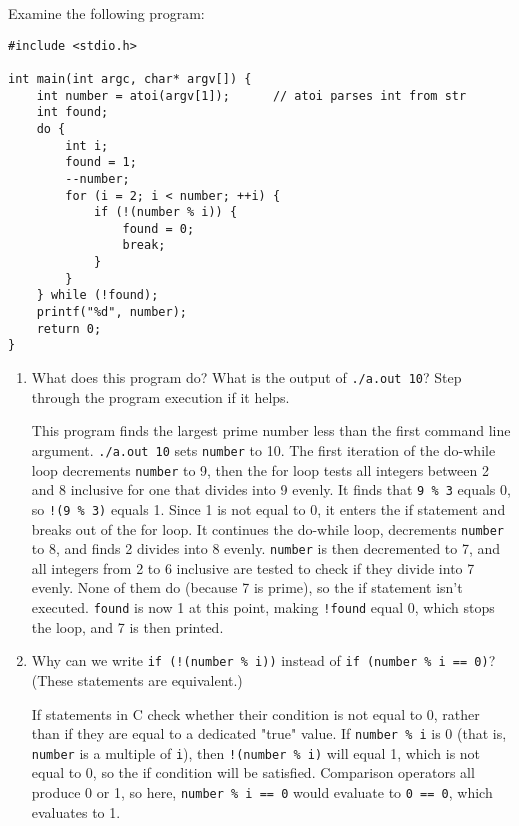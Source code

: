 Examine the following program:

\begin{verbatim}
#include <stdio.h>

int main(int argc, char* argv[]) {
    int number = atoi(argv[1]);      // atoi parses int from str
    int found;
    do {
        int i;
        found = 1;
        --number;
        for (i = 2; i < number; ++i) {
            if (!(number % i)) {
                found = 0;
                break;
            }
        }
    } while (!found);
    printf("%d", number);
    return 0;
}
\end{verbatim}

\begin{enumerate}

\item What does this program do? What is the output of \texttt{./a.out 10}? Step through the program execution if it helps.

\begin{answer}
This program finds the largest prime number less than the first command line argument. \texttt{./a.out 10} sets \texttt{number} to 10. The first iteration of the do-while loop decrements \texttt{number} to 9, then the for loop tests all integers between 2 and 8 inclusive for one that divides into 9 evenly. It finds that \texttt{9 \% 3} equals 0, so \texttt{!(9 \% 3)} equals 1. Since 1 is not equal to 0, it enters the if statement and breaks out of the for loop. It continues the do-while loop, decrements \texttt{number} to 8, and finds 2 divides into 8 evenly. \texttt{number} is then decremented to 7, and all integers from 2 to 6 inclusive are tested to check if they divide into 7 evenly. None of them do (because 7 is prime), so the if statement isn't executed. \texttt{found} is now 1 at this point, making \texttt{!found} equal 0, which stops the loop, and 7 is then printed.
\end{answer}



\item Why can we write \texttt{if (!(number \% i))} instead of \texttt{if (number \% i == 0)}? (These statements are equivalent.)

\begin{answer}
If statements in C check whether their condition is not equal to 0, rather than if they are equal to a dedicated "true" value. If \texttt{number \% i} is 0 (that is, \texttt{number} is a multiple of \texttt{i}), then \texttt{!(number \% i)} will equal 1, which is not equal to 0, so the if condition will be satisfied. Comparison operators all produce 0 or 1, so here, \texttt{number \% i == 0} would evaluate to \texttt{0 == 0}, which evaluates to 1.
\end{answer}



\end{enumerate}
